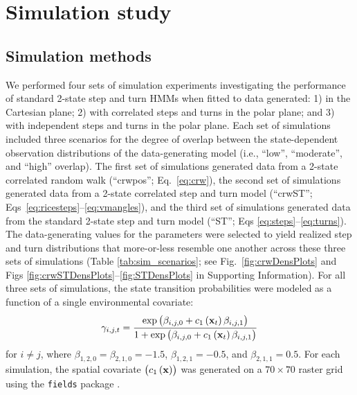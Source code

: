 \documentclass[12pt]{article}\usepackage[]{graphicx}\usepackage[]{xcolor}
\begin{document}
\section{Simulation study}
\subsection{Simulation methods}
We performed four sets of simulation experiments investigating the performance of standard 2-state step and turn HMMs when fitted to data generated: 1) in the Cartesian plane; 2) with correlated steps and turns in the polar plane; and 3) with independent steps and turns in the polar plane. Each set of simulations included three scenarios for the degree of overlap between the state-dependent observation distributions of the data-generating model (i.e., ``low'', ``moderate'', and ``high'' overlap). The first set of simulations generated data from a 2-state correlated random walk (``crwpos''; Eq.\ \ref{eq:crw}), the second set of simulations generated data from a 2-state correlated step and turn model (``crwST''; Eqs\ \ref{eq:ricesteps}--\ref{eq:vmangles}), and the third set of simulations generated data from the standard 2-state step and turn model (``ST''; Eqs \ref{eq:steps}--\ref{eq:turns}). The data-generating values for the parameters were selected to yield realized step and turn distributions that more-or-less resemble one another across these three sets of simulations (Table \ref{tab:sim_scenarios}; see Fig.\ \ref{fig:crwDensPlots} and Figs \ref{fig:crwSTDensPlots}--\ref{fig:STDensPlots} in Supporting Information). For all three sets of simulations, the state transition probabilities were modeled as a function of a single environmental covariate:
\begin{equation}
  \label{eq:simtpm}
  \gamma_{i,j,t} = \frac{\exp \left(\beta_{i,j,0}+c_1\left({\bf x}_t\right) \beta_{i,j,1}\right)}{1+\exp \left(\beta_{i,j,0}+c_1\left({\bf x}_t\right) \beta_{i,j,1}\right)}
\end{equation}
for $i \ne j$, where $\beta_{1,2,0}=\beta_{2,1,0}=-1.5$, $\beta_{1,2,1}=-0.5$, and $\beta_{2,1,1}=0.5$. For each simulation, the spatial covariate $\left(c_1\left({\bf x}\right)\right)$ was generated on a $70 \times 70$ raster grid using the %
\verb|fields| package \citep[][]{Nychka2021fields}.
\end{document}
